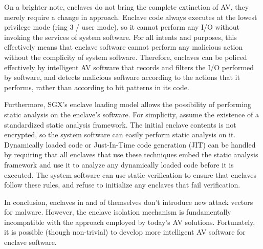 On a brighter note, enclaves do not bring the complete extinction of AV, they
merely require a change in approach. Enclave code always executes at the lowest
privilege mode (ring 3 / user mode), so it cannot perform any I/O without
invoking the services of system software. For all intents and purposes, this
effectively means that enclave software cannot perform any malicious action
without the complicity of system software. Therefore, enclaves can be policed
effectively by intelligent AV software that records and filters the I/O
performed by software, and detects malicious software according to the actions
that it performs, rather than according to bit patterns in its code.

Furthermore, SGX's enclave loading model allows the possibility of performing
static analysis on the enclave's software. For simplicity, assume the existence
of a standardized static analysis framework.  The initial enclave contents is
not encrypted, so the system software can easily perform static analysis on it.
Dynamically loaded code or Just-In-Time code generation (JIT) can be handled by
requiring that all enclaves that use these techniques embed the static analysis
framework and use it to analyze any dynamically loaded code before it is
executed. The system software can use static verification to ensure that
enclaves follow these rules, and refuse to initialize any enclaves that fail
verification.

In conclusion, enclaves in and of themselves don't introduce new attack vectors
for malware. However, the enclave isolation mechanism is fundamentally
incompatible with the approach employed by today's AV solutions. Fortunately,
it is possible (though non-trivial) to develop more intelligent AV software for
enclave software.
